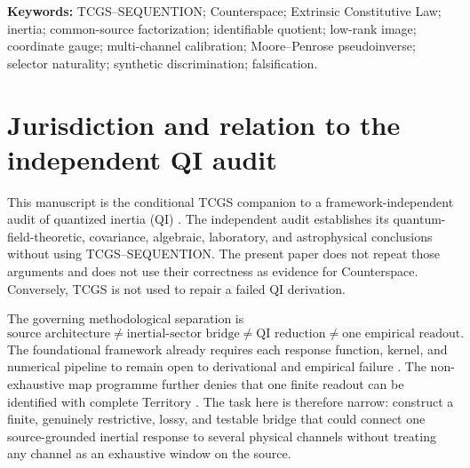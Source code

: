 \documentclass[11pt]{article}
\begin{document}
\begin{abstract}
A fully reproducible synthetic three-channel example demonstrates the forbidden region. Data generated from one rank-two bridge are accepted at the declared five-percent size, whereas independent channel kernels are rejected with unit empirical power in the reported Monte Carlo design. A near-saturated construction retaining 98 percent of unrestricted parameter capacity is rejected by the predeclared compression ceiling even though it satisfies a merely strict dimension inequality. Quantized inertia supplies a motivating case but no evidence for the framework: its laboratory proper-acceleration branch and galactic relational-acceleration branch remain different empirical laws until a covariant bridge is derived. Failure of the anchored low-rank image criterion, selector naturality, shared-sector consistency, or held-out predictive test rejects the inertial bridge proposed here. Success supports that bridge only; it does not automatically establish Counterspace, ECL, or non-ontic time.
\end{abstract}

\noindent\textbf{Keywords:} TCGS--SEQUENTION; Counterspace; Extrinsic Constitutive Law; inertia; common-source factorization; identifiable quotient; low-rank image; coordinate gauge; multi-channel calibration; Moore--Penrose pseudoinverse; selector naturality; synthetic discrimination; falsification.

\section*{Jurisdiction and relation to the independent QI audit}

This manuscript is the conditional TCGS companion to a framework-independent audit of quantized inertia (QI) \cite{ArellanoQIAudit2026}. The independent audit establishes its quantum-field-theoretic, covariance, algebraic, laboratory, and astrophysical conclusions without using TCGS--SEQUENTION. The present paper does not repeat those arguments and does not use their correctness as evidence for Counterspace. Conversely, TCGS is not used to repair a failed QI derivation.

The governing methodological separation is
\begin{equation}
\boxed{
\text{source architecture}
\neq
\text{inertial-sector bridge}
\neq
\text{QI reduction}
\neq
\text{one empirical readout}.
}
\label{eq:jurisdiction}
\end{equation}
The foundational framework already requires each response function, kernel, and numerical pipeline to remain open to derivational and empirical failure \cite{ArellanoFoundation2026}. The non-exhaustive map programme further denies that one finite readout can be identified with complete Territory \cite{ArellanoNoFinalMap2026}. The task here is therefore narrow: construct a finite, genuinely restrictive, lossy, and testable bridge that could connect one source-grounded inertial response to several physical channels without treating any channel as an exhaustive window on the source.
\end{document}
